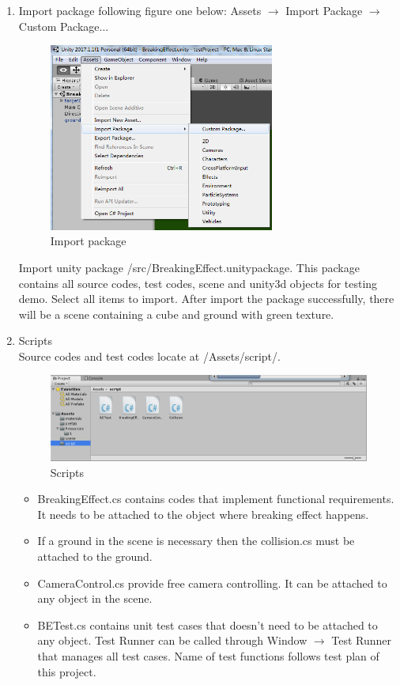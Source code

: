 \documentclass[12pt, titlepage]{article}
\begin{document}
	\begin{enumerate}
		
		\item {Import package following figure one below:}
		Assets $\to$ Import Package $\to$ Custom Package...
		
		\begin{figure}[H]
			\centering
			\includegraphics[width=0.7\textwidth]{./Import_package1.png}
			\caption{Import package}
			\label{FigIP}
		\end{figure}
		
		Import unity package /src/BreakingEffect.unitypackage. This package contains all source codes, test codes, scene and unity3d objects for testing demo. Select all items to import.
		After import the package successfully, there will be a scene containing a cube and ground with green texture. 
		
		\item {Scripts}\\
		Source codes and test codes locate at /Assets/script/. 
		
		\begin{figure}[H]
			\centering
			\includegraphics[width=1.1\textwidth]{./script.png}
			\caption{Scripts}
			\label{FigSc}
		\end{figure}
		
		\begin{itemize}		 
		\item BreakingEffect.cs contains codes that implement functional requirements. It needs to be attached to the object where breaking effect happens. 
		\item If a ground in the scene is necessary then the collision.cs must be attached to the ground. 
		\item CameraControl.cs provide free camera controlling. It can be attached to any object in the scene.
		\item BETest.cs contains unit test cases that doesn't need to be attached to any object. Test Runner can be called through Window $\to$ Test Runner that manages all test cases. Name of test functions follows test plan of this project. 
		

\end{itemize}
\end{enumerate}
\end{document}
